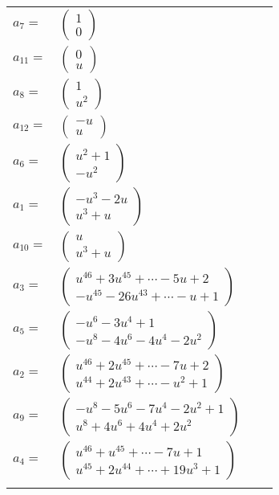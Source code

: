 \documentclass[1p]{elsarticle_modified}
\theoremstyle{definition}
\begin{document}
\begin{tabular}{m{7pt} m{180pt} m{7pt} m{180pt} }
\flushright $a_{7}=$&$\begin{pmatrix}1\\0\end{pmatrix}$ \\
\flushright $a_{11}=$&$\begin{pmatrix}0\\u\end{pmatrix}$ \\
\flushright $a_{8}=$&$\begin{pmatrix}1\\u^2\end{pmatrix}$ \\
\flushright $a_{12}=$&$\begin{pmatrix}- u\\u\end{pmatrix}$ \\
\flushright $a_{6}=$&$\begin{pmatrix}u^2+1\\- u^2\end{pmatrix}$ \\
\flushright $a_{1}=$&$\begin{pmatrix}- u^3-2 u\\u^3+u\end{pmatrix}$ \\
\flushright $a_{10}=$&$\begin{pmatrix}u\\u^3+u\end{pmatrix}$ \\
\flushright $a_{3}=$&$\begin{pmatrix}u^{46}+3 u^{45}+\cdots-5 u+2\\- u^{45}-26 u^{43}+\cdots- u+1\end{pmatrix}$ \\
\flushright $a_{5}=$&$\begin{pmatrix}- u^6-3 u^4+1\\- u^8-4 u^6-4 u^4-2 u^2\end{pmatrix}$ \\
\flushright $a_{2}=$&$\begin{pmatrix}u^{46}+2 u^{45}+\cdots-7 u+2\\u^{44}+2 u^{43}+\cdots- u^2+1\end{pmatrix}$ \\
\flushright $a_{9}=$&$\begin{pmatrix}- u^8-5 u^6-7 u^4-2 u^2+1\\u^8+4 u^6+4 u^4+2 u^2\end{pmatrix}$ \\
\flushright $a_{4}=$&$\begin{pmatrix}u^{46}+u^{45}+\cdots-7 u+1\\u^{45}+2 u^{44}+\cdots+19 u^3+1\end{pmatrix}$\\&\end{tabular}
\end{document}
